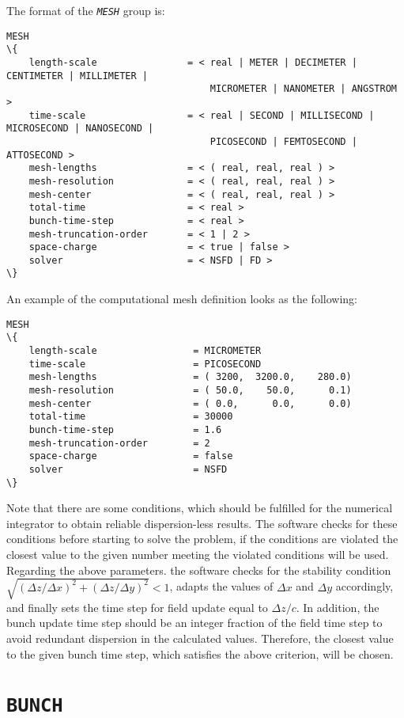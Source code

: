 The format of the {\tt \em \small MESH} group is:
%
\begin{Verbatim}[frame=single, fontsize=\small, tabsize=4, fontfamily=courier, fontseries=b, commandchars=\\\{\}, obeytabs]
MESH
\{
	length-scale				= < real | METER | DECIMETER | CENTIMETER | MILLIMETER | 
									MICROMETER | NANOMETER | ANGSTROM >
	time-scale					= < real | SECOND | MILLISECOND | MICROSECOND | NANOSECOND | 
									PICOSECOND | FEMTOSECOND |	ATTOSECOND >
	mesh-lengths				= < ( real, real, real ) >
	mesh-resolution		 		= < ( real, real, real ) >
	mesh-center				 	= < ( real, real, real ) >
	total-time					= < real >
	bunch-time-step		 		= < real >
	mesh-truncation-order 		= < 1 | 2 >
	space-charge  				= < true | false >
	solver						= < NSFD | FD >
\}
\end{Verbatim}
An example of the computational mesh definition looks as the following:
\begin{snugshade}
\begin{Verbatim}[fontsize=\small, tabsize=4, fontfamily=courier, fontseries=b, commandchars=\\\{\}, obeytabs]
MESH
\{
	length-scale 				 = MICROMETER
	time-scale					 = PICOSECOND
	mesh-lengths				 = ( 3200,  3200.0,    280.0)
	mesh-resolution				 = ( 50.0,    50.0,      0.1)
	mesh-center					 = ( 0.0,      0.0,      0.0)
	total-time 					 = 30000
	bunch-time-step				 = 1.6
	mesh-truncation-order		 = 2
	space-charge				 = false
	solver						 = NSFD
\}
\end{Verbatim}
\end{snugshade}
%
Note that there are some conditions, which should be fulfilled for the numerical integrator to obtain reliable dispersion-less results.
%
The software checks for these conditions before starting to solve the problem, if the conditions are violated the closest value to the given number meeting the violated conditions will be used.
%
Regarding the above parameters. the software checks for the stability condition $\sqrt{(\Delta z/\Delta x)^2+ (\Delta z/\Delta y)^2} < 1$, adapts the values of $\Delta x$ and $\Delta y$ accordingly, and finally sets the time step for field update equal to $\Delta z / c$.
%
In addition, the bunch update time step should be an integer fraction of the field time step to avoid redundant dispersion in the calculated values.
%
Therefore, the closest value to the given bunch time step, which satisfies the above criterion, will be chosen.

\section{\texttt{BUNCH}}

